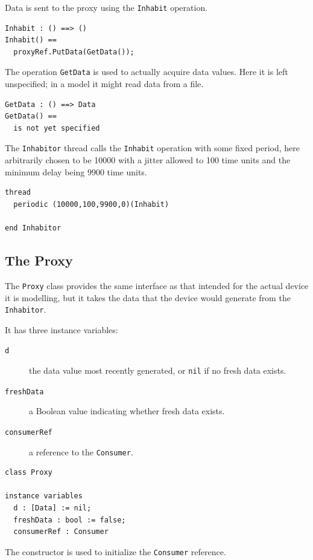 \documentclass{overturerepchap}
\begin{document}
Data is sent to the proxy using the \texttt{Inhabit} operation.

\begin{lstlisting}
Inhabit : () ==> ()
Inhabit() ==
  proxyRef.PutData(GetData());
\end{lstlisting}

The operation \texttt{GetData} is used to actually acquire data
values. Here it is left unspecified; in a model it might read data
from a file.

\begin{lstlisting}
GetData : () ==> Data
GetData() ==
  is not yet specified
\end{lstlisting}

The \texttt{Inhabitor} thread calls the \texttt{Inhabit} operation with some
fixed period, here arbitrarily chosen to be 10000 with a jitter allowed to 100
time units and the minimum delay being 9900 time units.

\begin{lstlisting}
thread
  periodic (10000,100,9900,0)(Inhabit)

end Inhabitor
\end{lstlisting}

\subsection{The Proxy}

The \texttt{Proxy} class provides the same interface as that intended
for the actual device it is modelling, but it takes the data that the
device would generate from the \texttt{Inhabitor}.

It has three instance variables:

\begin{description}
\item[\texttt{d}] the data value most recently generated, or \texttt{nil} if no
fresh data exists.
\item[\texttt{freshData}] a Boolean value indicating whether fresh data exists.
\item[\texttt{consumerRef}] a reference to the \texttt{Consumer}.
\end{description}

\begin{lstlisting}
class Proxy

instance variables
  d : [Data] := nil;
  freshData : bool := false;
  consumerRef : Consumer
\end{lstlisting}

The constructor is used to initialize the \texttt{Consumer} reference.
\end{document}
